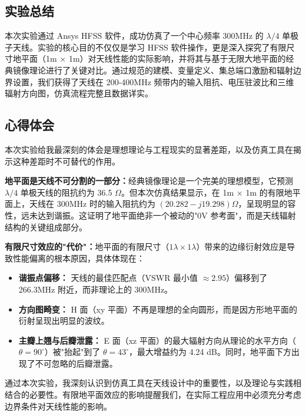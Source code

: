 \documentclass[12pt,a4paper,UTF8]{article}
\begin{document}
\subsection{实验总结}

本次实验通过 Ansys HFSS 软件，成功仿真了一个中心频率 300MHz 的 $\lambda/4$ 单极子天线。实验的核心目的不仅仅是学习 HFSS 软件操作，更是深入探究了有限尺寸地平面（1m × 1m）对天线性能的实际影响，并将其与基于无限大地平面的经典镜像理论进行了关键对比。通过规范的建模、变量定义、集总端口激励和辐射边界设置，我们获得了天线在 200-400MHz 频带内的输入阻抗、电压驻波比和三维辐射方向图，仿真流程完整且数据详实。

\subsection{心得体会}

本次实验给我最深刻的体会是理想理论与工程现实的显著差距，以及仿真工具在揭示这种差距时不可替代的作用。

\textbf{地平面是天线不可分割的一部分：}经典镜像理论是一个完美的理想模型，它预测 $\lambda/4$ 单极天线的阻抗约为 36.5 $\Omega$。但本次仿真结果显示，在 1m × 1m 的有限地平面上，天线在 300MHz 时的输入阻抗约为 $(20.282 - j19.298)\Omega$，呈现明显的容性，远未达到谐振。这证明了地平面绝非一个被动的"0V 参考面"，而是天线辐射结构的关键组成部分。

\textbf{有限尺寸效应的"代价"：}地平面的有限尺寸（$1\lambda \times 1\lambda$）带来的边缘衍射效应是导致性能偏离的根本原因，具体体现在：

\begin{itemize}
    \item \textbf{谐振点偏移：} 天线的最佳匹配点（VSWR 最小值 $\approx 2.95$）偏移到了 266.3MHz 附近，而非理论上的 300MHz。
    \item \textbf{方向图畸变：} H 面（xy 平面）不再是理想的全向圆形，而是因方形地平面的衍射呈现出明显的波纹。
    \item \textbf{主瓣上翘与后瓣泄露：} E 面（xz 平面）的最大辐射方向从理论的水平方向（$\theta=90^\circ$）被"抬起"到了 $\theta=43^\circ$，最大增益约为 4.24 dB。同时，地平面下方出现了不可忽略的后瓣泄露。
\end{itemize}

通过本次实验，我深刻认识到仿真工具在天线设计中的重要性，以及理论与实践相结合的必要性。有限地平面效应的影响提醒我们，在实际工程应用中必须充分考虑边界条件对天线性能的影响。
\end{document}
